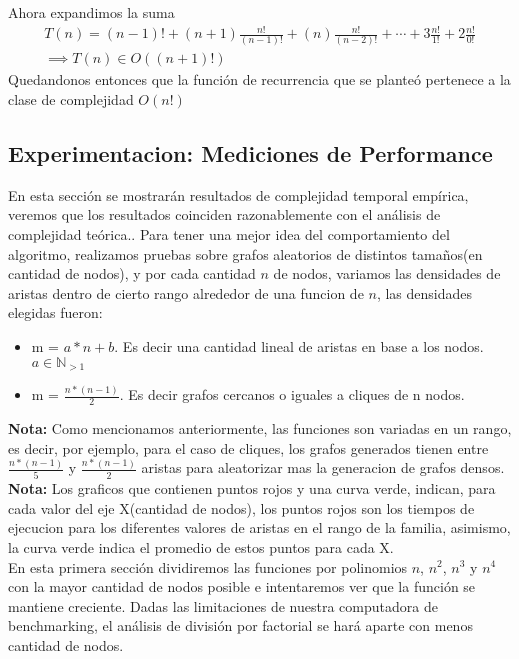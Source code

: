 Ahora expandimos la suma
\begin{equation*}
\begin{split}
T(n) = (n - 1)! + (n + 1)\frac{n!}{(n-1)!} + (n)\frac{n!}{(n-2)!} + \cdots + 3\frac{n!}{1!} + 2\frac{n!}{0!} \\
\implies T(n) \in O((n + 1)!)
\end{split}
\end{equation*}
Quedandonos entonces que la funci\'on de recurrencia que se plante\'o pertenece a la clase de complejidad $O(n!)$

\subsection{Experimentacion: Mediciones de Performance}
En esta secci\'on se mostrar\'an resultados de complejidad temporal emp\'irica, veremos que los resultados coinciden razonablemente con el an\'alisis de complejidad te\'orica..
Para tener una mejor idea del comportamiento del algoritmo, realizamos pruebas sobre grafos aleatorios de distintos tama\~nos(en cantidad de nodos), y por cada cantidad $n$ de nodos, variamos las densidades de aristas dentro de cierto rango alrededor de una funcion de $n$, las densidades elegidas fueron:
\begin{itemize}
	\item m = $a*n + b$. Es decir una cantidad lineal de aristas en base a los nodos. $a \in \mathbb{N}_{>1}$
	\item m = $\frac{n*(n-1)}{2}$. Es decir grafos cercanos o iguales a cliques de n nodos.
\end{itemize}


\textbf{Nota: } Como mencionamos anteriormente, las funciones son variadas en un rango, es decir, por ejemplo, para el caso de cliques, los grafos generados tienen entre $\frac{n*(n-1)}{5}$ y $\frac{n*(n-1)}{2}$ aristas para aleatorizar mas la generacion de grafos densos.\\

\textbf{Nota: } Los graficos que contienen puntos rojos y una curva verde, indican, para cada valor del eje X(cantidad de nodos), los puntos rojos son los tiempos de ejecucion para los diferentes valores de aristas en el rango de la familia, asimismo, la curva verde indica el promedio de estos puntos para cada X. \\

En esta primera secci\'on dividiremos las funciones por polinomios $n$, $n^2$, $n^3$ y $n^4$ con la mayor cantidad de nodos posible e intentaremos ver que la funci\'on se mantiene creciente. Dadas las limitaciones de nuestra computadora de benchmarking, el an\'alisis de divisi\'on por factorial se har\'a aparte con menos cantidad de nodos.


